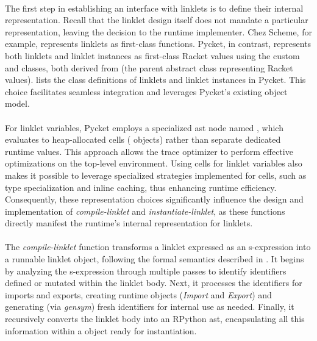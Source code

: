 		\paragraph{}%
			The first step in establishing an interface with linklets is to define their internal representation. Recall that the linklet design itself does not mandate a particular representation, leaving the decision to the runtime implementer. Chez Scheme, for example, represents linklets as first-class functions. Pycket, in contrast, represents both linklets and linklet instances as first-class Racket values using the custom  and  classes, both derived from  (the parent abstract class representing Racket values).  lists the class definitions of linklets and linklet instances in Pycket. This choice facilitates seamless integration and leverages Pycket’s existing object model.


		\paragraph{}%
			For linklet variables, Pycket employs a specialized \gls{ast} node named , which evaluates to heap-allocated cells ( objects) rather than separate dedicated runtime values. This approach allows the trace optimizer to perform effective optimizations on the top-level environment. Using cells for linklet variables also makes it possible to leverage specialized strategies implemented for cells, such as type specialization and inline caching, thus enhancing runtime efficiency. Consequently, these representation choices significantly influence the design and implementation of \emph{compile-linklet} and \emph{instantiate-linklet}, as these functions directly manifest the runtime’s internal representation for linklets.

		\paragraph{}%
			The \emph{compile-linklet} function transforms a linklet expressed as an s-expression into a runnable linklet object, following the formal semantics described in . It begins by analyzing the s-expression through multiple passes to identify identifiers defined or mutated within the linklet body. Next, it processes the identifiers for imports and exports, creating runtime objects (\emph{Import} and \emph{Export}) and generating (via \emph{gensym}) fresh identifiers for internal use as needed. Finally, it recursively converts the linklet body into an RPython \gls{ast}, encapsulating all this information within a  object ready for instantiation.

